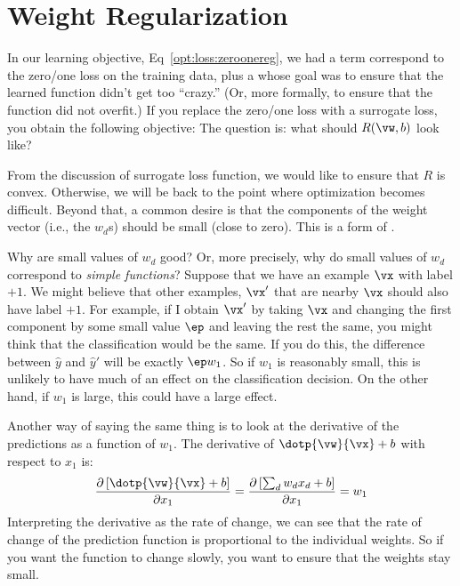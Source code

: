 \section{Weight Regularization}

In our learning objective, Eq~\eqref{opt:loss:zeroonereg}, we had a term
correspond to the zero/one loss on the training data, plus a
 whose goal was to ensure that the learned
function didn't get too ``crazy.''  (Or, more formally, to ensure that
the function did not overfit.)  If you replace the zero/one loss with a
surrogate loss, you obtain the following objective:
%
%
The question is: what should $R(\vw,b)$ look like?

From the discussion of surrogate loss function, we would like to
ensure that $R$ is convex.  Otherwise, we will be back to the point
where optimization becomes difficult.  Beyond that, a common desire is
that the components of the weight vector (i.e., the $w_d$s) should be
small (close to zero).  This is a form of .

Why are small values of $w_d$ good?  Or, more precisely, why do small
values of $w_d$ correspond to \emph{simple functions}?  Suppose that
we have an example $\vx$ with label $+1$.  We might believe that other
examples, $\vx'$ that are nearby $\vx$ should also have label $+1$.
For example, if I obtain $\vx'$ by taking $\vx$ and changing the first
component by some small value $\ep$ and leaving the rest the same, you
might think that the classification would be the same.  If you do
this, the difference between $\hat y$ and $\hat y'$ will be exactly
$\ep w_1$.  So if $w_1$ is reasonably small, this is unlikely to have
much of an effect on the classification decision.  On the other hand,
if $w_1$ is large, this could have a large effect.

Another way of saying the same thing is to look at the derivative of
the predictions as a function of $w_1$.  The derivative of
$\dotp{\vw}{\vx}+b$ with respect to $x_1$ is:
\begin{equation}
\frac {\partial \left[\dotp{\vw}{\vx}+b\right]} {\partial x_1}
= \frac {\partial \left[\sum_d w_d x_d+b\right]} {\partial x_1}
= w_1
\end{equation}
Interpreting the derivative as the rate of change, we can see that the
rate of change of the prediction function is proportional to the
individual weights.  So if you want the function to change slowly, you
want to ensure that the weights stay small.

